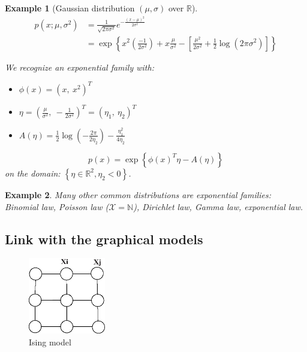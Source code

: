\documentclass[12pt]{report}
\newtheorem{example}{Example}[section]
\begin{document}
\begin{example}[Gaussian distribution $(\mu,\sigma)$ over $\mathbb{R}$]
$$\begin{aligned}
p(x;\mu , \sigma ^2) &= \frac{1}{\sqrt{2\pi\sigma^2}}e^{-\frac{(x-\mu)^2}{2\sigma^2}}\\
 &= \exp \left\lbrace x^2 \left( \frac{-1}{2 \sigma ^2}\right) +x \frac{\mu}{\sigma ^2} - \left[ \frac{\mu^2}{2 \sigma ^2} + \frac{1}{2} \log (2\pi \sigma ^2)\right]  \right\rbrace 
 \end{aligned} $$

\noindent
We recognize an exponential family with:
\begin{itemize}
  \item $\phi(x) = (x ,\: x^2)^T $
  \item $\eta = (\frac{\mu}{\sigma^2}, \: -\frac{1}{2\sigma^2})^T = (\eta_1,\: \eta_2)^T$
  \item $A(\eta) =\frac{1}{2}\log \left( -\frac{2\pi}{2\eta_2}\right)  - \frac{\eta_1^2}{4\eta_2}$
\end{itemize}
$$p(x) =  \exp \left\lbrace \phi(x)^T\eta - A(\eta)\right\rbrace $$
\noindent
on the domain: $\left\lbrace\eta \in \mathbb{R}^2, \eta_2 <0 \right\rbrace $.
\end{example}

\begin{example}
Many other common distributions are exponential families: Binomial law, Poisson law ($\mathcal{X} = \mathbb{N} $), Dirichlet law, Gamma law, exponential law.
\end{example}

\subsection{Link with the graphical models}

\begin{figure}[h]
\begin{center}
\includegraphics[width = 0.3\textwidth]{modele_ising.eps}
\caption{Ising model}
\end{center}
\end{figure}
\end{document}

